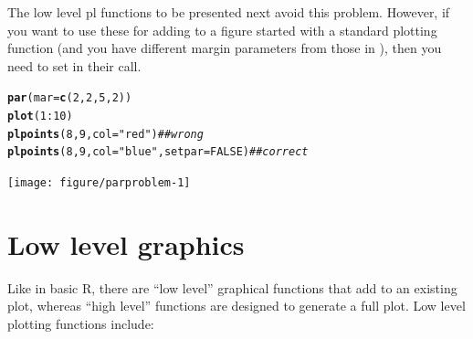 \documentclass[11pt]{article}\usepackage[]{graphicx}\usepackage[]{color}
\makeatletter
\newcommand{\hlnum}[1]{\textcolor[rgb]{0.686,0.059,0.569}{#1}}%
\newcommand{\hlstr}[1]{\textcolor[rgb]{0.192,0.494,0.8}{#1}}%
\newcommand{\hlcom}[1]{\textcolor[rgb]{0.678,0.584,0.686}{\textit{#1}}}%
\newcommand{\hlopt}[1]{\textcolor[rgb]{0,0,0}{#1}}%
\newcommand{\hlstd}[1]{\textcolor[rgb]{0.345,0.345,0.345}{#1}}%
\newcommand{\hlkwc}[1]{\textcolor[rgb]{0.333,0.667,0.333}{#1}}%
\newcommand{\hlkwd}[1]{\textcolor[rgb]{0.737,0.353,0.396}{\textbf{#1}}}%
\newenvironment{kframe}{%
 \def\at@end@of@kframe{}%
 \ifinner\ifhmode%
  \def\at@end@of@kframe{\end{minipage}}%
  \begin{minipage}{\columnwidth}%
 \fi\fi%
 \def\FrameCommand##1{\hskip\@totalleftmargin \hskip-\fboxsep
 \colorbox{shadecolor}{##1}\hskip-\fboxsep
     \hskip-\linewidth \hskip-\@totalleftmargin \hskip\columnwidth}%
 \MakeFramed {\advance\hsize-\width
   \@totalleftmargin\z@ \linewidth\hsize
   \@setminipage}}%
 {\par\unskip\endMakeFramed%
 \at@end@of@kframe}
\newenvironment{knitrout}{}{} %
\makeatother
\begin{document}
The low level pl functions to be presented next avoid this problem.
However, if you want to use these for adding to a figure started with
a standard plotting function (and you have different margin parameters
from those in ), then you need to set 
in their call.
\begin{knitrout}
\color{fgcolor}\begin{kframe}
\begin{alltt}
\hlkwd{par}\hlstd{(}\hlkwc{mar}\hlstd{=}\hlkwd{c}\hlstd{(}\hlnum{2}\hlstd{,}\hlnum{2}\hlstd{,}\hlnum{5}\hlstd{,}\hlnum{2}\hlstd{))}
\hlkwd{plot}\hlstd{(}\hlnum{1}\hlopt{:}\hlnum{10}\hlstd{)}
\hlkwd{plpoints}\hlstd{(}\hlnum{8}\hlstd{,}\hlnum{9}\hlstd{,} \hlkwc{col}\hlstd{=}\hlstr{"red"}\hlstd{)} \hlcom{## wrong}
\hlkwd{plpoints}\hlstd{(}\hlnum{8}\hlstd{,}\hlnum{9}\hlstd{,} \hlkwc{col}\hlstd{=}\hlstr{"blue"}\hlstd{,} \hlkwc{setpar}\hlstd{=}\hlnum{FALSE}\hlstd{)} \hlcom{## correct}
\end{alltt}
\end{kframe}
\texttt{[image: figure/parproblem-1]} 

\end{knitrout}
\section{Low level graphics}

Like in basic R, there are ``low level'' graphical functions that
add to an existing plot, whereas ``high level'' functions are designed to 
generate a full plot. Low level plotting functions include:
\end{document}
